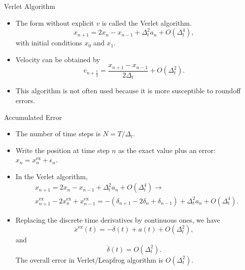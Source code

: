 \documentclass{beamer}
\begin{document}
\begin{frame}{Verlet Algorithm}
  \begin{itemize}
    \item The form without explicit $v$ is called the Verlet algorithm.
    \[
    x_{n+1}=2 x_n-x_{n-1}+\Delta_t^2 a_n+O\left(\Delta_t^4\right),
    \]
    with initial conditions $x_0$ and $x_1$.
    \item Velocity can be obtained by 
    \[ 
    v_{n+\frac{1}{2}}=\frac{x_{n+1}-x_{n-1}}{2\Delta_t}+O\left(\Delta_t^2\right).
    \]
    \item This algorithm is not often used because it is more susceptible to roundoff errors.
\end{itemize}
\end{frame}
\begin{frame}{Accumulated Error}
  \begin{itemize}
    \item The number of time steps is $N=T/\Delta_t$.
    \item Write the position at time step $n$ as the exact value plus an error:$x_n=x_n^\mathrm{ex}+\epsilon_n$.
    \item In the Verlet algorithm,
    \begin{align*}
      & x_{n+1}=2 x_n-x_{n-1}+\Delta_t^2 a_n+O\left(\Delta_t^4\right) \rightarrow \\
      & x_{n+1}^{\mathrm{ex}}-2 x_n^{\mathrm{ex}}+x_{n-1}^{\mathrm{ex}}=-\left(\delta_{n+1}-2 \delta_n+\delta_{n-1}\right)+\Delta_t^2 a_n+O\left(\Delta_t^4\right).
    \end{align*}
    \item  Replacing the discrete time derivatives by continuous ones, we have
    $$
    \ddot{x}^{\mathrm{ex}}(t)=-\ddot{\delta}(t)+a(t)+O\left(\Delta_t^2\right),
    $$
    and 
    $$ 
    \ddot{\delta}(t)=O\left(\Delta_t^2\right).
    $$
    The overall error in Verlet/Leapfrog algorithm is $O(\Delta_t^2)$.
  \end{itemize}
 \end{frame}
 
\end{document}
